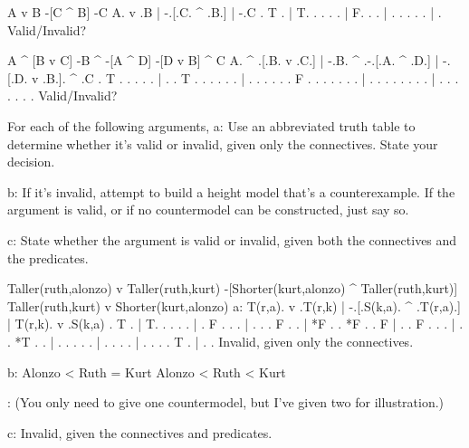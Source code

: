 \argument
 A v B
 -[C ^ B]
\argumentline
 -C
\endargument
        \answer
        \truthtable
         A. v .B | -.[.C. ^ .B.] | -.C
        \truthtableline
          . T .  | T. . .   . .  | F.
          .   .  |  . . .   . .  |  .
        \endtruthtable
        Valid/Invalid?
        \endanswer

\argument
 A ^ [B v C]
 -B ^ -[A ^ D]
\argumentline
 -[D v B] ^ C
\endargument
        \answer
        \truthtable
         A. ^ .[.B. v .C.] | -.B. ^ .-.[.A. ^ .D.] | -.[.D. v .B.]. ^ .C
        \truthtableline
          . T . . .   . .  |  . . T . . . .   . .  |  . . .   . . . F . 
          .   . . .   . .  |  . .   . . . .   . .  |  . . .   . . .   . 
        \endtruthtable
        Valid/Invalid?
        \endanswer

\endproblems

For each of the following arguments,
\list
a: Use an abbreviated truth table to determine whether it's valid or invalid, given only the connectives. State your decision.

b: If it's invalid, attempt to build a height model that's a counterexample. If the argument is valid, or if no countermodel can be constructed, just say so.

c: State whether the argument is valid or invalid, given both the connectives and the predicates.
\endlist

\problems
{}
\argument
 Taller(ruth,alonzo) v Taller(ruth,kurt)
 -[Shorter(kurt,alonzo) ^ Taller(ruth,kurt)]
\argumentline
 Taller(ruth,kurt) v Shorter(kurt,alonzo)
\endargument
        \answerlist
        a:
        \truthtable
         T(r,a). v .T(r,k) | -.[.S(k,a). ^ .T(r,a).] | T(r,k). v .S(k,a)
        \truthtableline
               . T .       | T. .      .   .      .  |       . F .
               .   .       |  . .      . F .      .  |   *F  .   .  *F
               .   .   F   |  . . F    .   .      .  |       .   .
           *T  .   .       |  . .      .   .      .  |       .   .
               .   .       |  . .      .   .   T  .  |       .   .
        \endtruthtable
        Invalid, given only the connectives.

        b:
        \heightmodel
         Alonzo < Ruth = Kurt
        \endheightmodel
        \OR
        \heightmodel
         Alonzo < Ruth < Kurt
        \endheightmodel

:        (You only need to give one countermodel, but I've given two for illustration.)

        c: Invalid, given the connectives and predicates.

